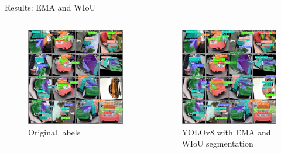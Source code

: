 \begin{frame}{Results: EMA and WIoU}
	\begin{columns}
		\begin{column}{0.5\textwidth}
			\begin{figure}[h]
				\centering
				\includegraphics[width=0.7\columnwidth]{images/origin.jpg}
				\caption{Original labels}
			\end{figure}
		\end{column}
		\begin{column}{0.5\textwidth}
			\begin{figure}[h]
				\includegraphics[width=0.7\columnwidth]{images/ema_wiou.jpg}
				\caption{YOLOv8 with EMA and WIoU segmentation}
			\end{figure}
		\end{column}
	\end{columns}
\end{frame}

